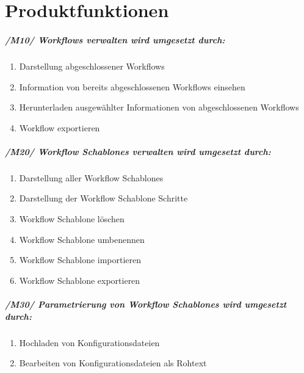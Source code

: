 \chapter{Produktfunktionen}

\paragraph{/M10/ \textit{\glspl{Workflow} verwalten} wird umgesetzt durch:}


\renewcommand{\labelenumi}{/FA\arabic{enumi}0/}
\begin{enumerate}
    \setlength\itemsep{-1em}    
    \item Darstellung abgeschlossener \glspl{Workflow}
    \item Information von bereits abgeschlossenen \glspl{Workflow} einsehen
    \item Herunterladen ausgewählter Informationen von abgeschlossenen \glspl{Workflow}
    \item \gls{Workflow} exportieren
    \setcounter{FAs}{\value{enumi}}
\end{enumerate}

\paragraph{/M20/ \textit{\glspl{Workflow Schablone} verwalten} wird umgesetzt durch:}
\begin{enumerate}
    \setlength\itemsep{-1em}
    \setcounter{enumi}{\value{FAs}}
    \item Darstellung aller \glspl{Workflow Schablone}
    \item Darstellung der \gls{Workflow Schablone} Schritte
    \item \gls{Workflow Schablone} löschen
    \item \gls{Workflow Schablone} umbenennen
        \item \gls{Workflow Schablone} importieren
    \item \gls{Workflow Schablone} exportieren
    \setcounter{FAs}{\value{enumi}}
\end{enumerate}

\paragraph{/M30/ \textit{Parametrierung von \glspl{Workflow Schablone}} wird umgesetzt durch:}
\begin{enumerate}
    \setlength\itemsep{-1em}
    \setcounter{enumi}{\value{FAs}}
    \item Hochladen von Konfigurationsdateien
    \item Bearbeiten von Konfigurationsdateien als Rohtext
    \setcounter{FAs}{\value{enumi}}
\end{enumerate}
\newpage
